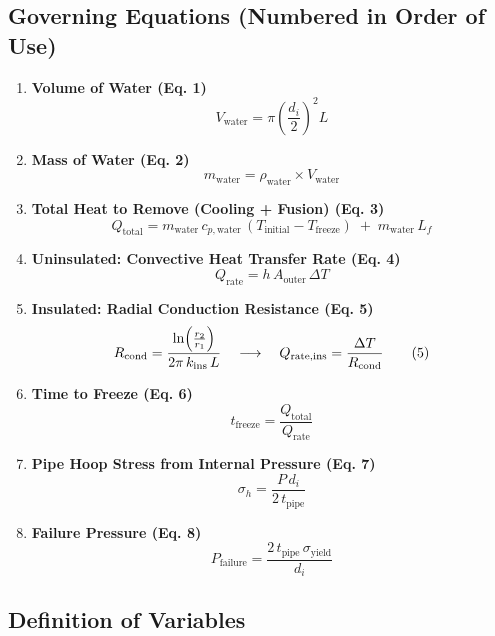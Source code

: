 \documentclass[12pt]{report}
\begin{document}
\subsection{Governing Equations (Numbered in Order of Use)}

\begin{enumerate}
    \item \textbf{Volume of Water (Eq. 1)}  
    \[
    V_{\text{water}} 
    = \pi \left(\frac{d_i}{2}\right)^2 L
    \tag{1}
    \]
    
    \item \textbf{Mass of Water (Eq. 2)}  
    \[
    m_{\text{water}}
    = \rho_{\text{water}} \times V_{\text{water}}
    \tag{2}
    \]

    \item \textbf{Total Heat to Remove (Cooling + Fusion) (Eq. 3)}  
    \[
    Q_{\text{total}} 
    = m_{\text{water}}\,c_{p,\text{water}}\,(T_{\text{initial}} - T_{\text{freeze}})
      \;+\; m_{\text{water}}\,L_f
    \tag{3}
    \]
    
    \item \textbf{Uninsulated: Convective Heat Transfer Rate (Eq. 4)}  
    \[
    Q_{\text{rate}} 
    = h\,A_{\text{outer}}\,\Delta T
    \tag{4}
    \]
    
    \item \textbf{Insulated: Radial Conduction Resistance (Eq. 5)}  
    \[
    R_{\text{cond}}
    = \frac{\ln\Bigl(\tfrac{r_2}{r_1}\Bigr)}{2\pi \, k_{\text{ins}} \, L}
    \quad\longrightarrow\quad
    Q_{\text{rate,ins}} 
    = \frac{\Delta T}{R_{\text{cond}}}
    \tag{5}
    \]
    
    \item \textbf{Time to Freeze (Eq. 6)}  
    \[
    t_{\text{freeze}} 
    = \frac{Q_{\text{total}}}{Q_{\text{rate}}}
    \tag{6}
    \]
    
    \item \textbf{Pipe Hoop Stress from Internal Pressure (Eq. 7)}  
    \[
    \sigma_h 
    = \frac{P\,d_i}{2\,t_{\text{pipe}}}
    \tag{7}
    \]
    
    \item \textbf{Failure Pressure (Eq. 8)}  
    \[
    P_{\text{failure}} 
    = \frac{2\,t_{\text{pipe}}\,\sigma_{\text{yield}}}{d_i}
    \tag{8}
    \]
\end{enumerate}

\subsection{Definition of Variables}
\end{document}
